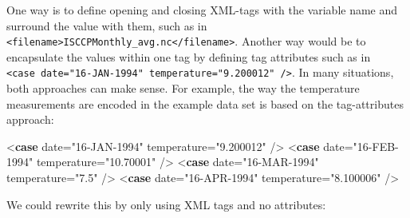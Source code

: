 \documentclass[
  12pt,
]{style/krantz}
\newenvironment{Shaded}{\begin{snugshade}}{\end{snugshade}}
\newcommand{\KeywordTok}[1]{\textcolor[rgb]{0.13,0.29,0.53}{\textbf{#1}}}
\newcommand{\NormalTok}[1]{#1}
\newcommand{\OtherTok}[1]{\textcolor[rgb]{0.56,0.35,0.01}{#1}}
\newcommand{\StringTok}[1]{\textcolor[rgb]{0.31,0.60,0.02}{#1}}
\begin{document}
One way is to define opening and closing XML-tags with the variable name and surround the value with them, such as in \texttt{\textless{}filename\textgreater{}ISCCPMonthly\_avg.nc\textless{}/filename\textgreater{}}. Another way would be to encapsulate the values within one tag by defining tag attributes such as in \texttt{\textless{}case\ date="16-JAN-1994"\ temperature="9.200012"\ /\textgreater{}}. In many situations, both approaches can make sense. For example, the way the temperature measurements are encoded in the example data set is based on the tag-attributes approach:

\begin{Shaded}
\begin{Highlighting}[]
\NormalTok{    \textless{}}\KeywordTok{case}\OtherTok{ date=}\StringTok{"16{-}JAN{-}1994"}\OtherTok{ temperature=}\StringTok{"9.200012"}\NormalTok{ /\textgreater{}}
\NormalTok{    \textless{}}\KeywordTok{case}\OtherTok{ date=}\StringTok{"16{-}FEB{-}1994"}\OtherTok{ temperature=}\StringTok{"10.70001"}\NormalTok{ /\textgreater{}}
\NormalTok{    \textless{}}\KeywordTok{case}\OtherTok{ date=}\StringTok{"16{-}MAR{-}1994"}\OtherTok{ temperature=}\StringTok{"7.5"}\NormalTok{ /\textgreater{}}
\NormalTok{    \textless{}}\KeywordTok{case}\OtherTok{ date=}\StringTok{"16{-}APR{-}1994"}\OtherTok{ temperature=}\StringTok{"8.100006"}\NormalTok{ /\textgreater{}}
\end{Highlighting}
\end{Shaded}

We could rewrite this by only using XML tags and no attributes:
\end{document}
